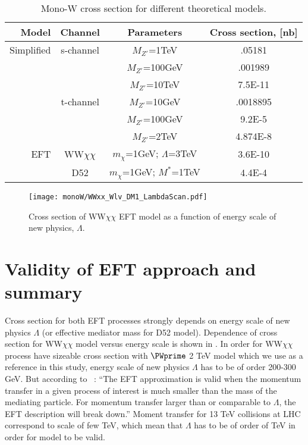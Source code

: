 \begin{table}[tp]
  \begin{tabular}{r|c|c|c}
    Model 	& Channel 	  & Parameters	    & Cross section, [nb] \\
    \midrule
    Simplified  & s-channel	  & $M_{Z'}$=1TeV    & .05181 \\
		&		  & $M_{Z'}$=100GeV  & .001989 \\
		&		  & $M_{Z'}$=10TeV   & 7.5E-11 \\
		& t-channel	  & $M_{Z'}$=10GeV   & .0018895 \\
		&		  & $M_{Z'}$=100GeV  & 9.2E-5 \\
		&		  & $M_{Z'}$=2TeV    & 4.874E-8 \\
    \midrule
    EFT 	& WW$\chi\chi$	  & $m_{\chi}$=1GeV; $\Lambda$=3TeV    & 3.6E-10 \\
		& D52		  & $m_{\chi}$=1GeV; $M^{*}$=1TeV	& 4.4E-4 \\
  \end{tabular}
  \caption{Mono-W cross section for different theoretical models.}
  \label{tab:TriggerDetails}
\end{table}


\begin{figure}[hb]
 \texttt{[image: monoW/WWxx\_Wlv\_DM1\_LambdaScan.pdf]}
  \caption{Cross section of WW$\chi\chi$ EFT model as a function of energy scale of new physics, $\Lambda$.}
  \label{fig:lambdaScan}
\end{figure}

\section{Validity of EFT approach and summary}

Cross section for both EFT processes strongly depends on energy scale of new physics $\Lambda$ (or effective mediator mass for D52 model).
Dependence of cross section for WW$\chi\chi$ model versus energy scale is shown in .
In order for WW$\chi\chi$ process have sizeable cross section with $\PWprime$ 2 TeV model which we use as a reference in this study, energy scale of new physics $\Lambda$
has to be of order 200-300 GeV. But according to ~\cite{arXiv:1512.00476}: 
``The EFT approximation is valid when the momentum transfer in a given
process of interest is much smaller than the mass of the mediating
particle. For momentum transfer larger than or comparable to
$\Lambda$, the EFT description will break down.''
Moment transfer for 13 TeV collisions at LHC correspond to scale of few TeV, which mean that $\Lambda$ has to be of order of TeV in order for model to be valid.

